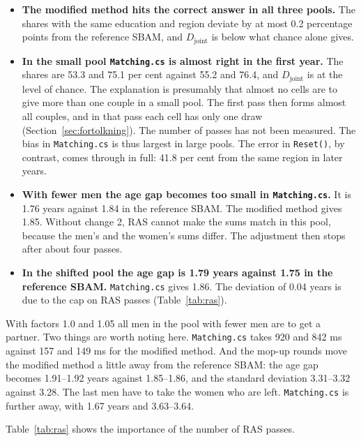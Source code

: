 \documentclass[12pt,a4paper]{article}
\newcommand{\kode}[1]{\texttt{#1}}
\begin{document}
\begin{itemize}
\item \textbf{The modified method hits the correct answer in all three pools.} The shares with the
same education and region deviate by at most 0.2 percentage points from the reference SBAM, and
$D_{\text{joint}}$ is below what chance alone gives.
\item \textbf{In the small pool \kode{Matching.cs} is almost right in the first year.} The shares
are 53.3 and 75.1 per cent against 55.2 and 76.4, and $D_{\text{joint}}$ is at the level of chance.
The explanation is presumably that almost no cells are to give more than one couple in a small
pool. The first pass then forms almost all couples, and in that pass each cell has only one draw
(Section~\ref{sec:fortolkning}). The number of passes has not been measured. The bias in
\kode{Matching.cs} is thus largest in large pools. The error in \kode{Reset()}, by contrast, comes
through in full: 41.8 per cent from the same region in later years.
\item \textbf{With fewer men the age gap becomes too small in \kode{Matching.cs}.} It is 1.76
years against 1.84 in the reference SBAM. The modified method gives 1.85. Without change 2, RAS
cannot make the sums match in this pool, because the men's and the women's sums differ. The
adjustment then stops after about four passes.
\item \textbf{In the shifted pool the age gap is 1.79 years against 1.75 in the reference SBAM.}
\kode{Matching.cs} gives 1.86. The deviation of 0.04 years is due to the cap on RAS passes
(Table~\ref{tab:ras}).
\end{itemize}

With factors 1.0 and 1.05 all men in the pool with fewer men are to get a partner. Two things are
worth noting here. \kode{Matching.cs} takes 920 and 842 ms against 157 and 149 ms for the modified
method. And the mop-up rounds move the modified method a little away from the reference SBAM: the
age gap becomes 1.91--1.92 years against 1.85--1.86, and the standard deviation 3.31--3.32 against
3.28. The last men have to take the women who are left. \kode{Matching.cs} is further away, with
1.67 years and 3.63--3.64.

Table~\ref{tab:ras} shows the importance of the number of RAS passes.
\end{document}
